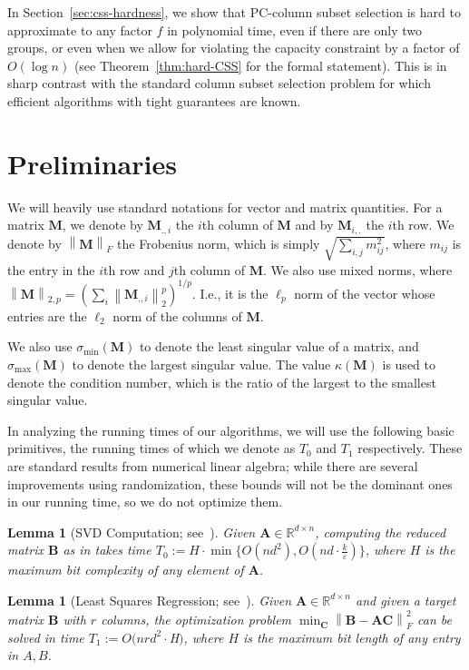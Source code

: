 \documentclass[11pt]{article}
\newcommand{\norm}[1]{\left\lVert#1\right\rVert}
\theoremstyle{plain}
\newtheorem{lemma}[theorem]{Lemma}
\theoremstyle{plain}
\theoremstyle{definition}
\theoremstyle{plain}
\theoremstyle{remark}
\newcommand{\RR}{\mathbb{R}}
\newcommand{\eps}{\varepsilon}
\DeclareRobustCommand{\fairCSSx}{PC-column subset selection}
\begin{document}
In Section~\ref{sec:css-hardness}, 
we show that \fairCSSx{} is hard to approximate to any factor $f$ in polynomial time, even if there are only two groups, or even when we allow for violating the capacity constraint by a factor of $O(\log n)$
(see Theorem~\ref{thm:hard-CSS} for the formal statement). This is in sharp contrast with the standard column subset selection problem for which efficient algorithms with tight guarantees are known. 



\section{Preliminaries}\label{sec:prelims}
We will heavily use standard notations for vector and matrix quantities. For a matrix $\bm{M}$, we denote by $\bm{M}_{.,i}$ the $i$th column of $\bm{M}$ and by $\bm{M}_{i,.}$ the $i$th row. We denote by $\norm{\bm{M}}_F$ the Frobenius norm, which is simply $\sqrt{\sum_{i,j} m_{ij}^2}$, where $m_{ij}$ is the entry in the $i$th row and $j$th column of $\bm{M}$. We also use mixed norms, 
where $\norm{\bm{M}}_{2,p} = \left( \sum_i \norm{\bm{M}_{.,i}}_2^p \right)^{1/p}$. I.e., it is the $\ell_p$ norm of the vector whose entries are the $\ell_2$ norm of the columns of $\bm{M}$. 
  

We also use $\sigma_{\min} (\bm{M})$ to denote the least singular value of a matrix, and $\sigma_{\max} (\bm{M})$ to denote the largest singular value. The value $\kappa (\bm{M})$ is used to denote the condition number, which is the ratio of the largest to the smallest singular value.

In analyzing the running times of our algorithms, we will use the following basic primitives, the running times of which we denote as $T_0$ and $T_1$ respectively. These are standard results from numerical linear algebra; while there are several improvements using randomization, these bounds will not be the dominant ones in our running time, so we do not optimize them.

\begin{lemma}[SVD Computation; see~\cite{golub2013matrix}]
\label{lem:svd-time}
Given $\bm{A}\in \RR^{d\times n}$, computing the reduced matrix $\bm{B}$ as in  takes time $T_0 := H \cdot \min \{ O(nd^2), O(nd \cdot \frac{k}{\eps})\}$, where $H$ is the maximum bit complexity of any element of $\bm{A}$.
\end{lemma}

\begin{lemma}[Least Squares Regression; see~\cite{golub2013matrix}]
\label{lem:regression-time}
Given $\bm{A} \in \RR^{d\times n}$ and given a target matrix $\bm{B}$ with $r$ columns, the optimization problem $\min_{\bm{C}} \norm{\bm{B} - \bm{A} \bm{C}}_F^2$ can be solved in time $T_1 := O(nrd^2 \cdot $H$)$, where $H$ is the maximum bit length of any entry in $A, B$.
\end{lemma}
\end{document}
